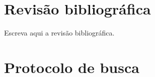 \documentclass[12pt,a4paper]{article}
\begin{document}
\section{Revisão bibliográfica}
%
%
%
%
%

Escreva aqui a revisão bibliográfica.



\appendix

\section{Protocolo de busca}
\end{document}
